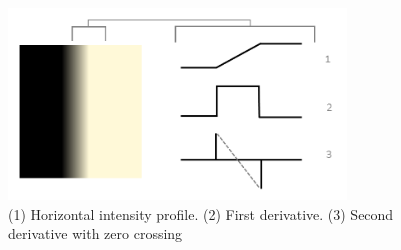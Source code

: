 \begin{figure}[h]
  \centering
  \includegraphics[width=0.8\textwidth]{fig/derivatives}
  \caption{(1) Horizontal intensity profile. (2) First derivative. (3) Second derivative with zero crossing}
  \label{fig:derivatives}
\end{figure}

